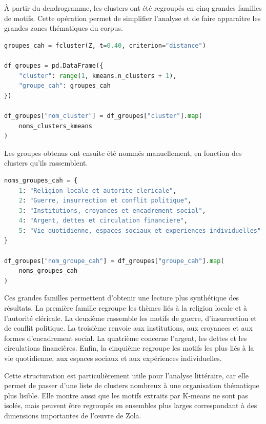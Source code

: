 \documentclass{article}
\begin{document}
À partir du dendrogramme, les clusters ont été regroupés en cinq grandes familles de motifs. Cette opération permet de simplifier l'analyse et de faire apparaître les grandes zones thématiques du corpus.

\begin{lstlisting}[language=Python, caption={Création des groupes CAH à partir des clusters K-means}]
groupes_cah = fcluster(Z, t=0.40, criterion="distance")

df_groupes = pd.DataFrame({
    "cluster": range(1, kmeans.n_clusters + 1),
    "groupe_cah": groupes_cah
})

df_groupes["nom_cluster"] = df_groupes["cluster"].map(
    noms_clusters_kmeans
)
\end{lstlisting}

Les groupes obtenus ont ensuite été nommés manuellement, en fonction des clusters qu'ils rassemblent.

\begin{lstlisting}[language=Python, caption={Nomination des grandes familles de motifs}]
noms_groupes_cah = {
    1: "Religion locale et autorite clericale",
    2: "Guerre, insurrection et conflit politique",
    3: "Institutions, croyances et encadrement social",
    4: "Argent, dettes et circulation financiere",
    5: "Vie quotidienne, espaces sociaux et experiences individuelles"
}

df_groupes["nom_groupe_cah"] = df_groupes["groupe_cah"].map(
    noms_groupes_cah
)
\end{lstlisting}

Ces grandes familles permettent d'obtenir une lecture plus synthétique des résultats. La première famille regroupe les thèmes liés à la religion locale et à l'autorité cléricale. La deuxième rassemble les motifs de guerre, d'insurrection et de conflit politique. La troisième renvoie aux institutions, aux croyances et aux formes d'encadrement social. La quatrième concerne l'argent, les dettes et les circulations financières. Enfin, la cinquième regroupe les motifs les plus liés à la vie quotidienne, aux espaces sociaux et aux expériences individuelles.

Cette structuration est particulièrement utile pour l'analyse littéraire, car elle permet de passer d'une liste de clusters nombreux à une organisation thématique plus lisible. Elle montre aussi que les motifs extraits par K-means ne sont pas isolés, mais peuvent être regroupés en ensembles plus larges correspondant à des dimensions importantes de l'œuvre de Zola.
\end{document}
